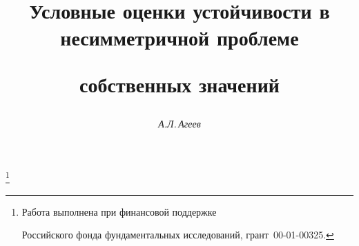











\newcommand{\cond}{\operatorname{cond}}


\newcommand{\tts}[1]{}




\renewcommand{\baselinestretch}{1.07}







\setcounter{page}{3}















\author{\it А.Л.\,Агеев}




\title{Условные оценки устойчивости в несимметричной проблеме


собственных значений}


\thanks{Работа выполнена при финансовой поддержке


Российского фонда фундаментальных исследований, грант \No\,00-01-00325.}





\date{}




\pagestyle{plain} %





